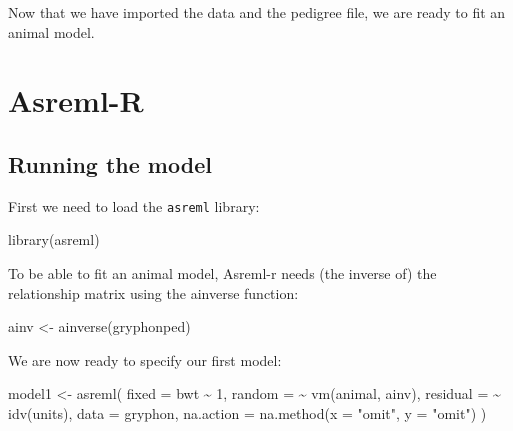 \documentclass[
  12pt,
]{book}
\newenvironment{Shaded}{\begin{snugshade}}{\end{snugshade}}
\newcommand{\AttributeTok}[1]{\textcolor[rgb]{0.77,0.63,0.00}{#1}}
\newcommand{\DecValTok}[1]{\textcolor[rgb]{0.00,0.00,0.81}{#1}}
\newcommand{\FunctionTok}[1]{\textcolor[rgb]{0.00,0.00,0.00}{#1}}
\newcommand{\NormalTok}[1]{#1}
\newcommand{\OtherTok}[1]{\textcolor[rgb]{0.56,0.35,0.01}{#1}}
\newcommand{\SpecialCharTok}[1]{\textcolor[rgb]{0.00,0.00,0.00}{#1}}
\newcommand{\StringTok}[1]{\textcolor[rgb]{0.31,0.60,0.02}{#1}}
\begin{document}
Now that we have imported the data and the pedigree file, we are ready to fit an animal model.

\hypertarget{asreml-r-1}{%
\section{Asreml-R}\label{asreml-r-1}}

\hypertarget{running-the-model}{%
\subsection{Running the model}\label{running-the-model}}

First we need to load the \texttt{asreml} library:

\begin{Shaded}
\begin{Highlighting}[]
\FunctionTok{library}\NormalTok{(asreml)}
\end{Highlighting}
\end{Shaded}

To be able to fit an animal model, Asreml-r needs (the inverse of) the relationship matrix using the ainverse function:

\begin{Shaded}
\begin{Highlighting}[]
\NormalTok{ainv }\OtherTok{\textless{}{-}} \FunctionTok{ainverse}\NormalTok{(gryphonped)}
\end{Highlighting}
\end{Shaded}

We are now ready to specify our first model:

\begin{Shaded}
\begin{Highlighting}[]
\NormalTok{model1 }\OtherTok{\textless{}{-}} \FunctionTok{asreml}\NormalTok{(}
  \AttributeTok{fixed =}\NormalTok{ bwt }\SpecialCharTok{\textasciitilde{}} \DecValTok{1}\NormalTok{, }\AttributeTok{random =} \SpecialCharTok{\textasciitilde{}} \FunctionTok{vm}\NormalTok{(animal, ainv),}
  \AttributeTok{residual =} \SpecialCharTok{\textasciitilde{}} \FunctionTok{idv}\NormalTok{(units),}
  \AttributeTok{data =}\NormalTok{ gryphon,}
  \AttributeTok{na.action =} \FunctionTok{na.method}\NormalTok{(}\AttributeTok{x =} \StringTok{"omit"}\NormalTok{, }\AttributeTok{y =} \StringTok{"omit"}\NormalTok{)}
\NormalTok{)}
\end{Highlighting}
\end{Shaded}
\end{document}
